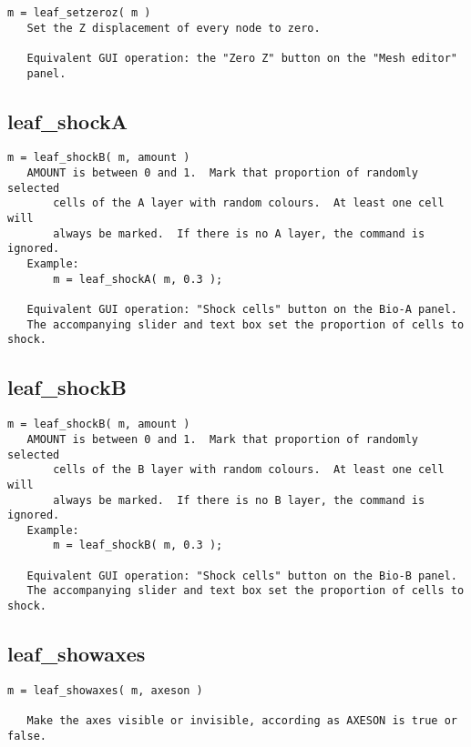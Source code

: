 \begin{verbatim}
m = leaf_setzeroz( m )
   Set the Z displacement of every node to zero.

   Equivalent GUI operation: the "Zero Z" button on the "Mesh editor"
   panel.
\end{verbatim}

\subsection{leaf\_shockA}\label{section-leaf-shockA}

\begin{verbatim}
m = leaf_shockB( m, amount )
   AMOUNT is between 0 and 1.  Mark that proportion of randomly selected
       cells of the A layer with random colours.  At least one cell will
       always be marked.  If there is no A layer, the command is ignored.
   Example:
       m = leaf_shockA( m, 0.3 );

   Equivalent GUI operation: "Shock cells" button on the Bio-A panel.
   The accompanying slider and text box set the proportion of cells to shock.
\end{verbatim}

\subsection{leaf\_shockB}\label{section-leaf-shockB}

\begin{verbatim}
m = leaf_shockB( m, amount )
   AMOUNT is between 0 and 1.  Mark that proportion of randomly selected
       cells of the B layer with random colours.  At least one cell will
       always be marked.  If there is no B layer, the command is ignored.
   Example:
       m = leaf_shockB( m, 0.3 );

   Equivalent GUI operation: "Shock cells" button on the Bio-B panel.
   The accompanying slider and text box set the proportion of cells to shock.
\end{verbatim}

\subsection{leaf\_showaxes}\label{section-leaf-showaxes}

\begin{verbatim}
m = leaf_showaxes( m, axeson )

   Make the axes visible or invisible, according as AXESON is true or false.
\end{verbatim}

